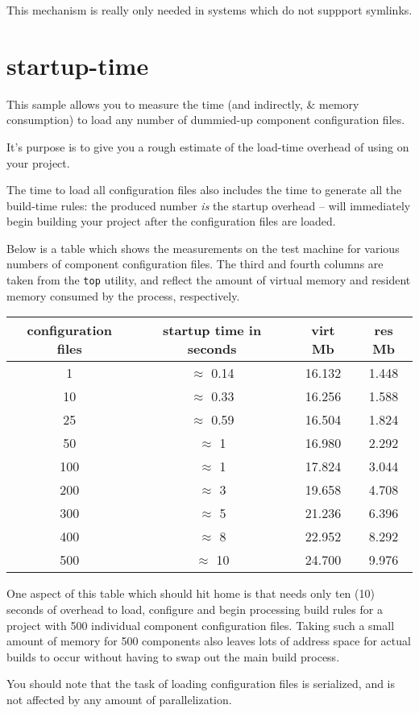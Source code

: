 This mechanism is really only needed in systems which do not suppport
symlinks.

\section{startup-time}\label{samples:startup-time}

This sample allows you to measure the time (and indirectly, \lmsbw \&
\make memory consumption) to load any number of dummied-up component
configuration files.

It's purpose is to give you a rough estimate of the load-time overhead
of using \lmsbw on your project.

The time to load all configuration files also includes the time to
generate all the build-time \make rules: the produced number \emph{is}
the startup overhead -- \make will immediately begin building your
project after the configuration files are loaded.

Below is a table which shows the measurements on the test machine for
various numbers of component configuration files.  The third and
fourth columns are taken from the \texttt{top} utility, and reflect
the amount of virtual memory and resident memory consumed by the
process, respectively.

\begin{tabular}{|c|c|c|c|}
  \hline configuration files  & startup time in seconds & virt Mb & res Mb \\
  \hline   1 & $\approx$ 0.14  & 16.132 & 1.448 \\
  \hline  10 & $\approx$ 0.33  & 16.256 & 1.588 \\
  \hline  25 & $\approx$ 0.59  & 16.504 & 1.824 \\
  \hline  50 & $\approx$ 1  & 16.980 & 2.292 \\
  \hline 100 & $\approx$ 1  & 17.824 & 3.044 \\
  \hline 200 & $\approx$ 3  & 19.658 & 4.708 \\
  \hline 300 & $\approx$ 5  & 21.236 & 6.396 \\
  \hline 400 & $\approx$ 8  & 22.952 & 8.292 \\
  \hline 500 & $\approx$ 10 & 24.700 & 9.976 \\
  \hline
\end{tabular}

One aspect of this table which should hit home is that \lmsbw needs
only ten (10) seconds of overhead to load, configure and begin
processing build rules for a project with 500 individual component
configuration files.  Taking such a small amount of memory for 500
components also leaves lots of address space for actual builds to
occur without having to swap out the main build process.

You should note that the task of loading configuration files is
serialized, and is not affected by any amount of parallelization.
